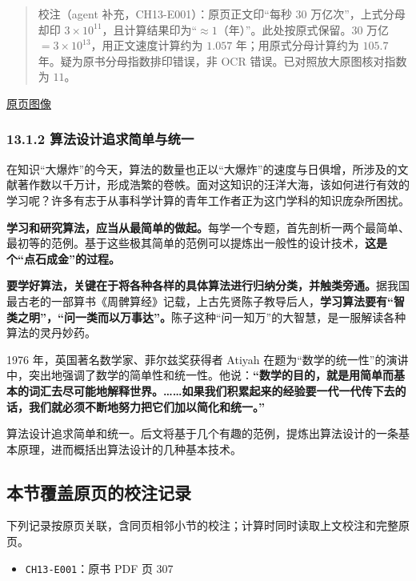 \documentclass[
  10pt,
  fontset=fandol]{ctexart}
\providecommand{\tightlist}{%
  \setlength{\itemsep}{0pt}\setlength{\parskip}{0pt}}
\begin{document}
\begin{quote}
校注（agent 补充，CH13-E001）：原页正文印``每秒 30 万亿次''，上式分母却印 \(3\times10^{11}\)，且计算结果印为``\(\approx1\)（年）''。此处按原式保留。\(30\) 万亿 \(=3\times10^{13}\)，用正文速度计算约为 \(1.057\) 年；用原式分母计算约为 \(105.7\) 年。疑为原书分母指数排印错误，非 OCR 错误。已对照放大原图核对指数为 \(11\)。
\end{quote}

\href{../../source-images/pdf-308.jpeg}{原页图像}

\subsubsection{13.1.2 算法设计追求简单与统一}\label{ux7b97ux6cd5ux8bbeux8ba1ux8ffdux6c42ux7b80ux5355ux4e0eux7edfux4e00}

在知识``大爆炸''的今天，算法的数量也正以``大爆炸''的速度与日俱增，所涉及的文献著作数以千万计，形成浩繁的卷帙。面对这知识的汪洋大海，该如何进行有效的学习呢？许多有志于从事科学计算的青年工作者正为这门学科的知识庞杂所困扰。

\textbf{学习和研究算法，应当从最简单的做起。}每学一个专题，首先剖析一两个最简单、最初等的范例。基于这些极其简单的范例可以提炼出一般性的设计技术，\textbf{这是个``点石成金''的过程。}

\textbf{要学好算法，关键在于将各种各样的具体算法进行归纳分类，并触类旁通。}据我国最古老的一部算书《周髀算经》记载，上古先贤陈子教导后人，\textbf{学习算法要有``智类之明''，``问一类而以万事达''。}陈子这种``问一知万''的大智慧，是一服解读各种算法的灵丹妙药。

1976 年，英国著名数学家、菲尔兹奖获得者 Atiyah 在题为``数学的统一性''的演讲中，突出地强调了数学的简单性和统一性。他说：\textbf{``数学的目的，就是用简单而基本的词汇去尽可能地解释世界。\ldots\ldots 如果我们积累起来的经验要一代一代传下去的话，我们就必须不断地努力把它们加以简化和统一。''}

算法设计追求简单和统一。后文将基于几个有趣的范例，提炼出算法设计的一条基本原理，进而概括出算法设计的几种基本技术。

\subsection{本节覆盖原页的校注记录}\label{ux672cux8282ux8986ux76d6ux539fux9875ux7684ux6821ux6ce8ux8bb0ux5f55}

下列记录按原页关联，含同页相邻小节的校注；计算时同时读取上文校注和完整原页。

\begin{itemize}
\tightlist
\item
  \texttt{CH13-E001}：原书 PDF 页 307
\end{itemize}
\end{document}
